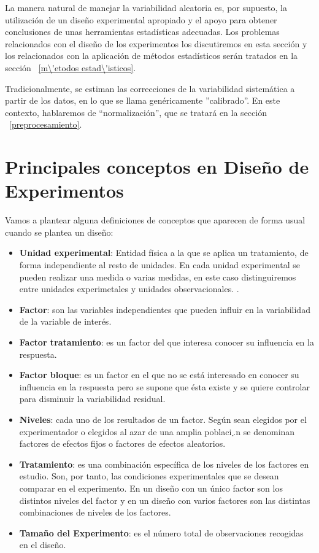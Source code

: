La manera natural de manejar la variabilidad aleatoria es, por supuesto, la
utilizaci\'on de un dise\~no experimental apropiado y el apoyo para obtener
conclusiones de unas herramientas estad\'isticas adecuadas. Los problemas
relacionados con el dise\~no de los experimentos los discutiremos en esta secci\'on
y los relacionados con la aplicaci\'on de m\'etodos estad\'isticos ser\'an tratados
en la secci\'on  ~\ref{m\'etodos estad\'isticos}.

Tradicionalmente, se estiman las correcciones de la variabilidad sistem\'atica
a partir de los datos, en lo que se llama gen\'ericamente ''calibrado''. En este
contexto, hablaremos de ``normalizaci\'on'', que se tratar\'a en la secci\'on
 ~\ref{preprocesamiento}.

\section{Principales conceptos en Dise\~no de Experimentos}

Vamos a plantear alguna definiciones de conceptos que aparecen de forma usual cuando se plantea un dise\~no:
\begin{itemize}

\item \textbf{Unidad experimental}: Entidad f\'isica a la que se aplica un tratamiento, de forma independiente al resto de unidades. En cada unidad experimental se pueden realizar una medida o varias medidas, en este caso distinguiremos entre unidades experimetales y unidades observacionales. .
\item \textbf{Factor}: son las variables independientes que pueden influir en la variabilidad de la variable de inter\'es.
\item \textbf{Factor tratamiento}: es un factor del que interesa conocer su influencia en la respuesta.
 \item \textbf{Factor bloque}: es un factor en el que no se est\'a interesado en conocer su influencia en la respuesta pero se supone que \'esta existe y se quiere controlar para disminuir la variabilidad residual.
 \item \textbf{Niveles}: cada uno de los resultados de un factor. Seg\'un sean elegidos por el experimentador o elegidos al azar de una amplia poblaci܇n se denominan factores de efectos fijos o factores de efectos  aleatorios.
 \item \textbf{Tratamiento}: es una combinaci\'on espec\'ifica de los niveles de los factores en estudio. Son, por tanto, las condiciones experimentales que se desean comparar en el experimento. En un dise\~no con un \'unico factor son los distintos niveles del factor y en un dise\~no con varios factores son las distintas combinaciones de niveles de los factores.
 \item \textbf{Tama\~no del Experimento}: es el n\'umero total de observaciones recogidas en el dise\~no.
 \end{itemize}

